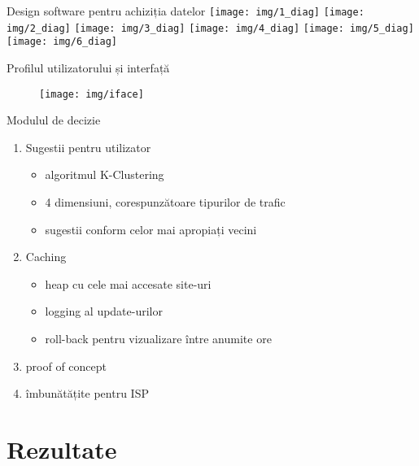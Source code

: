 \documentclass{beamer}
\begin{document}
\begin{frame}{Design software pentru achiziția datelor}
\pause
	\only<1>  {\texttt{[image: img/1\_diag]} }
	\only<2>  {\texttt{[image: img/2\_diag]} }
	\only<3>  {\texttt{[image: img/3\_diag]} }
	\only<4>  {\texttt{[image: img/4\_diag]} }
	\only<5>  {\texttt{[image: img/5\_diag]} }
	\only<6>  {\texttt{[image: img/6\_diag]} }
\end{frame}

\begin{frame}{Profilul utilizatorului și interfață}
\pause
	\begin{figure}
        \texttt{[image: img/iface]}
    	\end{figure}
\end{frame}

\begin{frame}{Modulul de decizie}
\pause
	\begin {enumerate} [<+->]
		\item {	Sugestii pentru utilizator
			\begin{itemize} [<+->]
				\item algoritmul K-Clustering
				\item 4 dimensiuni, corespunzătoare tipurilor de trafic
				\item sugestii conform celor mai apropiați vecini
			\end{itemize}
		}
		\item { Caching
			\begin{itemize} [<+->]
				\item heap cu cele mai accesate site-uri
				\item logging al update-urilor
				\item roll-back pentru vizualizare între anumite ore
			\end{itemize}
		}
		\item { proof of concept }
		\item { îmbunătățite pentru ISP }
	\end{enumerate}
\end{frame}

%	
	
\section{Rezultate}
\end{document}
